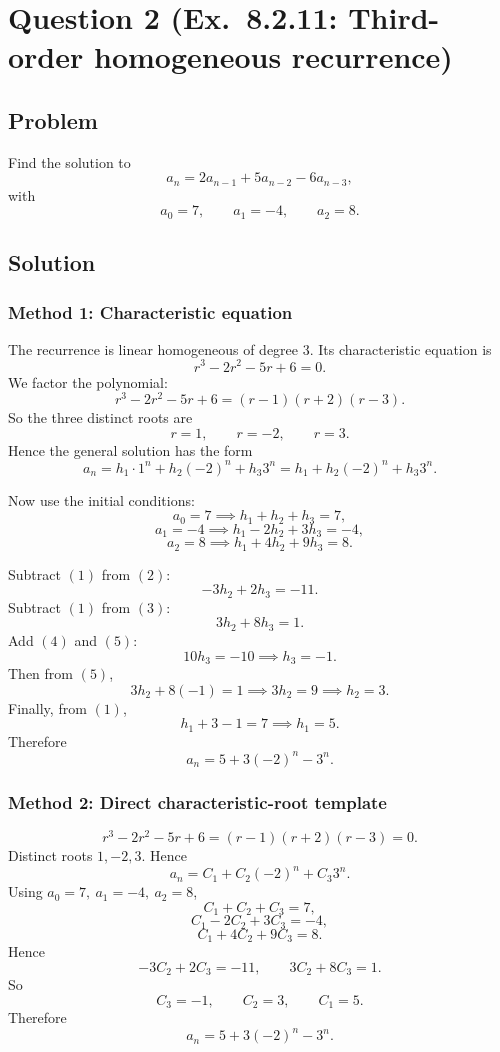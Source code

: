 \documentclass[12pt]{article}
\begin{document}
\newpage

\section{Question 2 (Ex.\ 8.2.11: Third-order homogeneous recurrence)}

\subsection{Problem}
Find the solution to
\[
a_n=2a_{n-1}+5a_{n-2}-6a_{n-3},
\]
with
\[
a_0=7,\qquad a_1=-4,\qquad a_2=8.
\]

\subsection{Solution}

\subsubsection{Method 1: Characteristic equation}
The recurrence is linear homogeneous of degree \(3\). Its characteristic equation is
\[
r^3-2r^2-5r+6=0.
\]
We factor the polynomial:
\[
r^3-2r^2-5r+6=(r-1)(r+2)(r-3).
\]
So the three distinct roots are
\[
r=1,\qquad r=-2,\qquad r=3.
\]
Hence the general solution has the form
\[
a_n=h_1\cdot 1^n+h_2(-2)^n+h_3 3^n
=h_1+h_2(-2)^n+h_3 3^n.
\]

Now use the initial conditions:
\[
a_0=7 \implies h_1+h_2+h_3=7, \tag{1}
\]
\[
a_1=-4 \implies h_1-2h_2+3h_3=-4, \tag{2}
\]
\[
a_2=8 \implies h_1+4h_2+9h_3=8. \tag{3}
\]

Subtract \((1)\) from \((2)\):
\[
-3h_2+2h_3=-11. \tag{4}
\]
Subtract \((1)\) from \((3)\):
\[
3h_2+8h_3=1. \tag{5}
\]
Add \((4)\) and \((5)\):
\[
10h_3=-10 \implies h_3=-1.
\]
Then from \((5)\),
\[
3h_2+8(-1)=1 \implies 3h_2=9 \implies h_2=3.
\]
Finally, from \((1)\),
\[
h_1+3-1=7 \implies h_1=5.
\]
Therefore
\[
\boxed{a_n=5+3(-2)^n-3^n.}
\]

\newpage
\subsubsection{Method 2: Direct characteristic-root template}
\[
r^3-2r^2-5r+6=(r-1)(r+2)(r-3)=0.
\]
Distinct roots \(1,-2,3\). Hence
\[
a_n=C_1+C_2(-2)^n+C_3 3^n.
\]
Using \(a_0=7,\ a_1=-4,\ a_2=8\),
\[
C_1+C_2+C_3=7,
\]
\[
C_1-2C_2+3C_3=-4,
\]
\[
C_1+4C_2+9C_3=8.
\]
Hence
\[
-3C_2+2C_3=-11,\qquad 3C_2+8C_3=1.
\]
So
\[
C_3=-1,\qquad C_2=3,\qquad C_1=5.
\]
Therefore
\[
\boxed{a_n=5+3(-2)^n-3^n.}
\]
\end{document}
